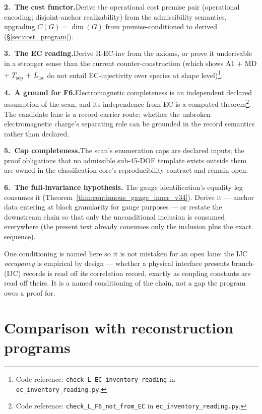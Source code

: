 \documentclass[11pt]{article}
\theoremstyle{definition}
\newcommand{\coderef}[2]{\footnote{Code reference: \texttt{#1} in \texttt{#2}.}}
\begin{document}
\smallskip\noindent\textbf{2.\ The cost functor.}\quad Derive the
operational cost premise pair (operational encoding; disjoint-anchor
realizability) from the admissibility semantics, upgrading
$C(G) = \dim(G)$ from premise-conditioned to derived
(\S\ref{sec:cost_program}).

\smallskip\noindent\textbf{3.\ The EC reading.}\quad Derive R-EC-inv
from the axioms, or prove it underivable in a stronger sense than the
current counter-construction (which shows A1 $+$ MD $+$
$T_{\mathrm{sep}}$ $+$ $L_{\mathrm{loc}}$ do not entail EC-injectivity
over species at shape
level)\coderef{check\_L\_EC\_inventory\_reading}{ec\_inventory\_reading.py}.

\smallskip\noindent\textbf{4.\ A ground for F6.}\quad Electromagnetic
completeness is an independent declared assumption of the scan, and
its independence from EC is a computed
theorem\coderef{check\_L\_F6\_not\_from\_EC}{ec\_inventory\_reading.py}.
The candidate lane is a record-carrier route: whether the unbroken
electromagnetic charge's separating role can be grounded in the record
semantics rather than declared.

\smallskip\noindent\textbf{5.\ Cap completeness.}\quad The scan's
enumeration caps are declared inputs; the proof obligations that no
admissible sub-45-DOF template exists outside them are owned in the
classification core's reproducibility contract and remain open.

\smallskip\noindent\textbf{6.\ The full-invariance hypothesis.}\quad
The gauge identification's equality leg consumes it
(Theorem~\ref{thm:continuous_gauge_inner_v34}).  Derive it --- anchor
data entering at block granularity for gauge purposes --- or restate
the downstream chain so that only the unconditional inclusion is
consumed everywhere (the present text already consumes only the
inclusion plus the exact sequence).

\smallskip\noindent One conditioning is named here so it is not
mistaken for an open lane: the IJC \emph{occupancy} is empirical by
design --- whether a physical interface presents branch-(IJC) records
is read off its correlation record, exactly as coupling constants are
read off theirs.  It is a named conditioning of the chain, not a gap
the program owes a proof for.


\newpage

\appendix


\section{Comparison with reconstruction programs}
\label{app:literature_found}
\end{document}
